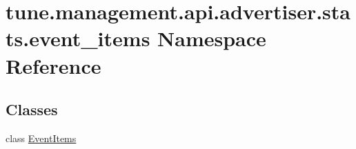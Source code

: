 \hypertarget{namespacetune_1_1management_1_1api_1_1advertiser_1_1stats_1_1event__items}{\section{tune.\-management.\-api.\-advertiser.\-stats.\-event\-\_\-items Namespace Reference}
\label{namespacetune_1_1management_1_1api_1_1advertiser_1_1stats_1_1event__items}
}
\subsection*{Classes}
\begin{DoxyCompactItemize}
\item 
class \hyperlink{classtune_1_1management_1_1api_1_1advertiser_1_1stats_1_1event__items_1_1EventItems}{Event\-Items}
\end{DoxyCompactItemize}
